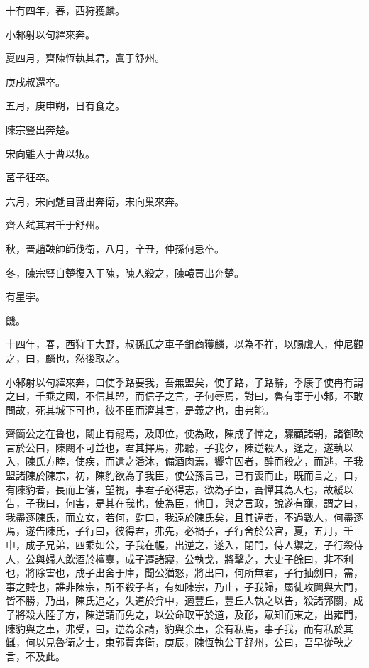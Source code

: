 \begin{pinyinscope}
十有四年，春，西狩獲麟。

小邾射以句繹來奔。

夏四月，齊陳恆執其君，寘于舒州。

庚戌叔還卒。

五月，庚申朔，日有食之。

陳宗豎出奔楚。

宋向魋入于曹以叛。

莒子狂卒。

六月，宋向魋自曹出奔衛，宋向巢來奔。

齊人弒其君壬于舒州。

秋，晉趙鞅帥師伐衛，八月，辛丑，仲孫何忌卒。

冬，陳宗豎自楚復入于陳，陳人殺之，陳轅買出奔楚。

有星孛。

饑。

十四年，春，西狩于大野，叔孫氏之車子鉏商獲麟，以為不祥，以賜虞人，仲尼觀之，曰，麟也，然後取之。

小邾射以句繹來奔，曰使季路要我，吾無盟矣，使子路，子路辭，季康子使冉有謂之曰，千乘之國，不信其盟，而信子之言，子何辱焉，對曰，魯有事于小邾，不敢問故，死其城下可也，彼不臣而濟其言，是義之也，由弗能。

齊簡公之在魯也，闞止有寵焉，及即位，使為政，陳成子憚之，驟顧諸朝，諸御鞅言於公曰，陳闞不可並也，君其擇焉，弗聽，子我夕，陳逆殺人，逢之，遂執以入，陳氏方睦，使疾，而遺之潘沐，備酒肉焉，饗守囚者，醉而殺之，而逃，子我盟諸陳於陳宗，初，陳豹欲為子我臣，使公孫言已，已有喪而止，既而言之，曰，有陳豹者，長而上僂，望視，事君子必得志，欲為子臣，吾憚其為人也，故緩以告，子我曰，何害，是其在我也，使為臣，他日，與之言政，說遂有寵，謂之曰，我盡逐陳氏，而立女，若何，對曰，我遠於陳氏矣，且其違者，不過數人，何盡逐焉，遂告陳氏，子行曰，彼得君，弗先，必禍子，子行舍於公宮，夏，五月，壬申，成子兄弟，四乘如公，子我在幄，出逆之，遂入，閉門，侍人禦之，子行殺侍人，公與婦人飲酒於檀臺，成子遷諸寢，公執戈，將擊之，大史子餘曰，非不利也，將除害也，成子出舍于庫，聞公猶怒，將出曰，何所無君，子行抽劍曰，需，事之賊也，誰非陳宗，所不殺子者，有如陳宗，乃止，子我歸，屬徒攻闈與大門，皆不勝，乃出，陳氏追之，失道於弇中，適豐丘，豐丘人執之以告，殺諸郭關，成子將殺大陸子方，陳逆請而免之，以公命取車於道，及耏，眾知而東之，出雍門，陳豹與之車，弗受，曰，逆為余請，豹與余車，余有私焉，事子我，而有私於其讎，何以見魯衛之士，東郭賈奔衛，庚辰，陳恆執公于舒州，公曰，吾早從鞅之言，不及此。


\end{pinyinscope}
